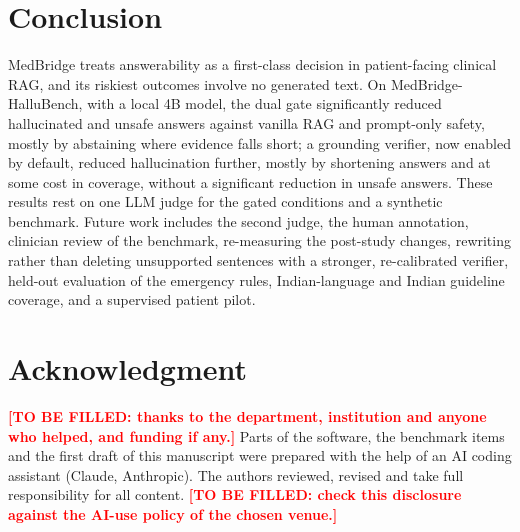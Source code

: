 \documentclass[conference]{IEEEtran}
\DeclareRobustCommand{\pending}[1]{\textcolor{red}{\textbf{#1}}}
\begin{document}
\section{Conclusion}\label{sec:conclusion}

MedBridge treats answerability as a first-class decision in patient-facing clinical RAG, and its riskiest outcomes involve no generated text. On MedBridge-HalluBench, with a local 4B model, the dual gate significantly reduced hallucinated and unsafe answers against vanilla RAG and prompt-only safety, mostly by abstaining where evidence falls short; a grounding verifier, now enabled by default, reduced hallucination further, mostly by shortening answers and at some cost in coverage, without a significant reduction in unsafe answers. These results rest on one LLM judge for the gated conditions and a synthetic benchmark. Future work includes the second judge, the human annotation, clinician review of the benchmark, re-measuring the post-study changes, rewriting rather than deleting unsupported sentences with a stronger, re-calibrated verifier, held-out evaluation of the emergency rules, Indian-language and Indian guideline coverage, and a supervised patient pilot.

\section*{Acknowledgment}

\pending{[TO BE FILLED: thanks to the department, institution and anyone who helped, and funding if any.]} Parts of the software, the benchmark items and the first draft of this manuscript were prepared with the help of an AI coding assistant (Claude, Anthropic). The authors reviewed, revised and take full responsibility for all content. \pending{[TO BE FILLED: check this disclosure against the AI-use policy of the chosen venue.]}



\end{document}
